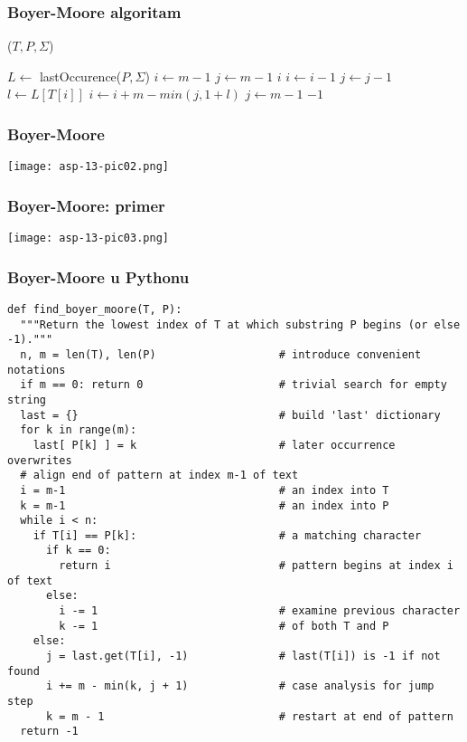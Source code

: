 \documentclass[compress,aspectratio=169]{beamer}
\begin{document}
\begin{frame}
  \frametitle{Boyer-Moore algoritam}
  ($T, P, \Sigma$)
  \begin{algorithmic}
    \STATE $L \leftarrow$ lastOccurence($P,\Sigma$)
    \STATE $i \leftarrow m-1$ 
    \STATE $j \leftarrow m-1$ 
    \REPEAT
          \RETURN $i$ 
        \ELSE
          \STATE $i \leftarrow i-1$
          \STATE $j \leftarrow j-1$
        \ENDIF
      \ELSE
        \STATE $l \leftarrow L[T[i]]$ 
        \STATE $i \leftarrow i + m - min(j, 1+l)$ 
        \STATE $j \leftarrow m-1$
      \ENDIF
    \RETURN $-1$ 
  \end{algorithmic}    
\end{frame}

\begin{frame}[fragile]
  \frametitle{Boyer-Moore}
  \begin{center}
    \texttt{[image: asp-13-pic02.png]}
  \end{center}
\end{frame}

\begin{frame}[fragile]
  \frametitle{Boyer-Moore: primer}
  \begin{center}
    \texttt{[image: asp-13-pic03.png]}
  \end{center}
\end{frame}

\begin{frame}
  \frametitle{Boyer-Moore u Pythonu}
\begin{verbatim}
def find_boyer_moore(T, P):
  """Return the lowest index of T at which substring P begins (or else -1)."""
  n, m = len(T), len(P)                   # introduce convenient notations
  if m == 0: return 0                     # trivial search for empty string
  last = {}                               # build 'last' dictionary
  for k in range(m):
    last[ P[k] ] = k                      # later occurrence overwrites
  # align end of pattern at index m-1 of text
  i = m-1                                 # an index into T
  k = m-1                                 # an index into P
  while i < n:
    if T[i] == P[k]:                      # a matching character
      if k == 0:
        return i                          # pattern begins at index i of text
      else:
        i -= 1                            # examine previous character
        k -= 1                            # of both T and P
    else:
      j = last.get(T[i], -1)              # last(T[i]) is -1 if not found
      i += m - min(k, j + 1)              # case analysis for jump step
      k = m - 1                           # restart at end of pattern
  return -1
\end{verbatim}
\end{frame}
\end{document}
